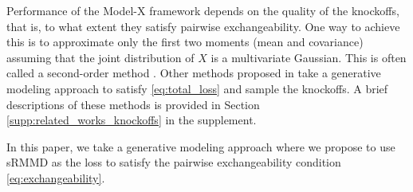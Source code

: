 \documentclass{article}
\theoremstyle{definition}
\begin{document}
Performance of the Model-X framework depends on the quality of the knockoffs, that is, to what extent they satisfy pairwise exchangeability. One way to achieve this is to approximate only the first two moments (mean and covariance) assuming that the joint distribution of $X$ is a multivariate Gaussian. This is often called a second-order method \cite{candes2016panning}. Other methods proposed in \cite{salimans2016improved,liu2018auto,romano2020deep,sudarshan2020deep} take a generative modeling approach to satisfy \eqref{eq:total_loss} and sample the knockoffs. A brief descriptions of these methods is provided in Section \ref{supp:related_works_knockoffs} in the supplement.

In this paper, we take a generative modeling approach where we propose to use sRMMD as the loss to satisfy the pairwise exchangeability condition \eqref{eq:exchangeability}. 
\end{document}
